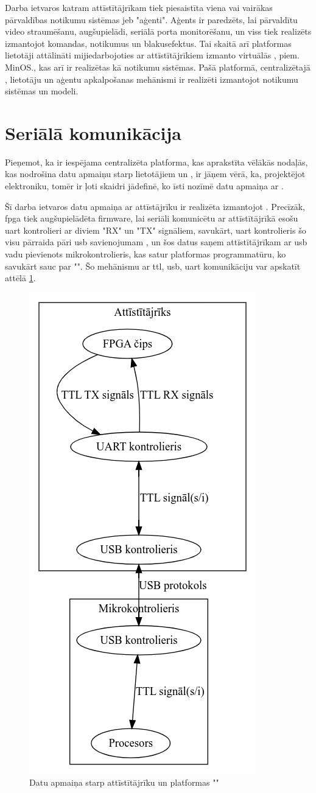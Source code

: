 Darba ietvaros katram attīstītājrīkam tiek piesaistīta viena vai vairākas
pārvaldības notikumu sistēmas jeb "aģenti". Aģents ir paredzēts, lai pārvaldītu
video straumēšanu,  augšupielādi, seriālā
porta monitorēšanu, un viss tiek realizēts izmantojot komandas, notikumus un
blakusefektus. Tai skaitā arī platformas lietotāji attālināti mijiedarbojoties
ar attīstītājrīkiem izmanto virtuālās , piem.
MinOS., kas arī ir realizētas kā notikumu sistēmas. Pašā platformā,
centralizētajā , lietotāju un aģentu apkalpošanas
mehānismi ir realizēti izmantojot notikumu sistēmas un 
modeli. 

\section{Seriālā komunikācija}
\label{sec:serial}

Pieņemot, ka ir iespējama centralizēta platforma, kas aprakstīta vēlākās
nodaļās, kas nodrošina datu apmaiņu starp lietotājiem un
, ir jāņem vērā, ka, projektējot elektroniku, tomēr ir
ļoti skaidri jādefinē, ko īsti nozīmē datu apmaiņa ar
.

Šī darba ietvaros datu apmaiņa ar attīstājrīku  ir
realizēta izmantojot . Precīzāk,
\gls{fpga} tiek augšupielādēta \gls{firmware}, lai seriāli komunicētu ar
attīstītājrīkā esošu \gls{uart} kontrolieri ar diviem "RX" un "TX" signāliem,
savukārt, \gls{uart} kontrolieris šo visu pārraida pāri \gls{usb} savienojumam
\cite[para. USB-UART Bridge]{DigilentAnvylReference}, un šos datus saņem
attīstītājrīkam ar \gls{usb} vadu pievienots mikrokontrolieris, kas satur
platformas programmatūru, ko savukārt sauc par "". Šo
mehānismu ar \gls{ttl}, \gls{usb}, \gls{uart} komunikāciju var apskatīt attēlā
\ref{fig:agentcomms}.


\begin{figure}[H]
    \includegraphics[width=0.3\linewidth]{assets/agentcomms-grey.png}
    \centering
    \caption{Datu apmaiņa starp attīstītājrīku un platformas ""}
    \label{fig:agentcomms}
\end{figure}

